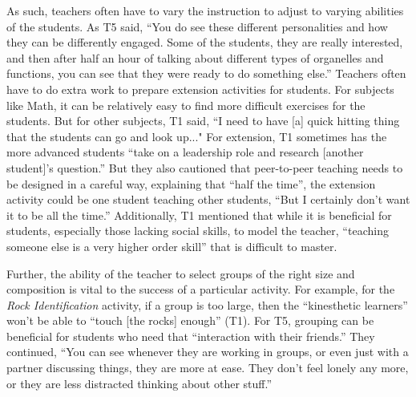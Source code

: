 As such, teachers often have to vary the instruction to adjust to varying abilities of the students.  As T5 said, ``You do see these different personalities and how they can be differently engaged.  Some of the students, they are really interested, and then after half an hour of talking about different types of organelles and functions, you can see that they were ready to do something else.''   Teachers often have to do extra work to prepare extension activities for students.  For subjects like Math, it can be relatively easy to find more difficult exercises for the students.  But for other subjects, T1 said, ``I need to have [a] quick hitting thing that the students can go and look up..." For extension, T1 sometimes has the more advanced students ``take on a leadership role and research [another student]'s question.''  But they also cautioned that peer-to-peer teaching needs to be designed in a careful way, explaining that ``half the time'', the extension activity could be one student teaching other students, ``But I certainly don't want it to be all the time.'' Additionally, T1 mentioned that while it is beneficial for students, especially those lacking social skills, to model the teacher, ``teaching someone else is a very higher order skill'' that is difficult to master.   


Further, the ability of the teacher to select groups of the right size and composition is vital to the success of a particular activity.  For example, for the \textit{Rock Identification} activity, if a group is too large, then the ``kinesthetic learners'' won't be able to ``touch [the rocks] enough'' (T1).  For T5, grouping can be beneficial for students who need that ``interaction with their friends.''  They continued, ``You can see whenever they are working in groups, or even just with a partner discussing things, they are more at ease.  They don't feel lonely any more, or they are less distracted thinking about other stuff.'' 

